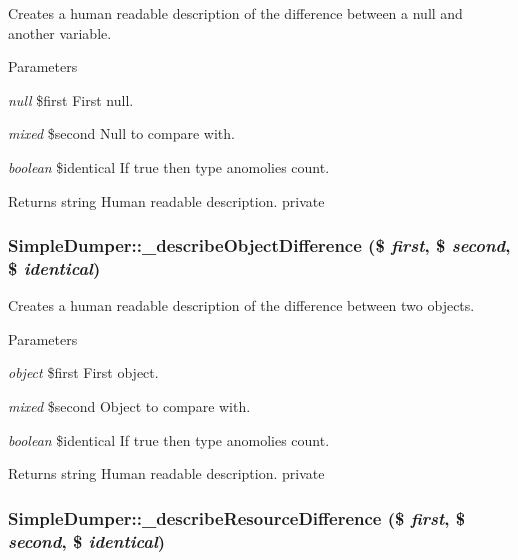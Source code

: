 Creates a human readable description of the difference between a null and another variable. 
\begin{DoxyParams}{Parameters}
\item[{\em null}]\$first First null. \item[{\em mixed}]\$second Null to compare with. \item[{\em boolean}]\$identical If true then type anomolies count. \end{DoxyParams}
\begin{DoxyReturn}{Returns}
string Human readable description.  private 
\end{DoxyReturn}
\hypertarget{class_simple_dumper_af8c3d07af65c9ffcf68a0089c98e6b24}{
\subsubsection[{\_\-describeObjectDifference}]{\setlength{\rightskip}{0pt plus 5cm}SimpleDumper::\_\-describeObjectDifference (\$ {\em first}, \/  \$ {\em second}, \/  \$ {\em identical})}}
\label{class_simple_dumper_af8c3d07af65c9ffcf68a0089c98e6b24}
Creates a human readable description of the difference between two objects. 
\begin{DoxyParams}{Parameters}
\item[{\em object}]\$first First object. \item[{\em mixed}]\$second Object to compare with. \item[{\em boolean}]\$identical If true then type anomolies count. \end{DoxyParams}
\begin{DoxyReturn}{Returns}
string Human readable description.  private 
\end{DoxyReturn}
\hypertarget{class_simple_dumper_a5b97a3602c33af778f5e9f0711e42073}{
\subsubsection[{\_\-describeResourceDifference}]{\setlength{\rightskip}{0pt plus 5cm}SimpleDumper::\_\-describeResourceDifference (\$ {\em first}, \/  \$ {\em second}, \/  \$ {\em identical})}}
